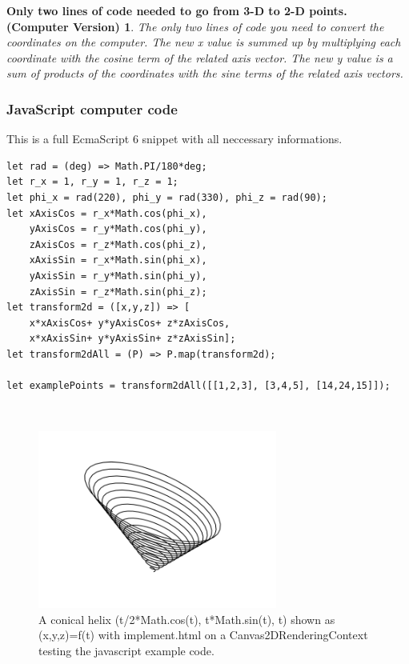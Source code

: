 \documentclass[a4paper]{article}
\begin{document}
\newtheorem{CodeTheorem}{Only two lines of code needed to go from 3-D to 2-D points. (Computer Version)}
\begin{CodeTheorem}
The only two lines of code you need to convert the coordinates on the computer. The new x value
is summed up by multiplying each coordinate with the cosine term of the related axis vector. The new y value
is a sum of products of the coordinates with the sine terms of the related axis vectors.
\end{CodeTheorem}

\subsubsection{JavaScript computer code}
\begin{example}
This is a full EcmaScript 6 snippet with all neccessary informations.\\
\begin{lstlisting}
let rad = (deg) => Math.PI/180*deg;
let r_x = 1, r_y = 1, r_z = 1; 
let phi_x = rad(220), phi_y = rad(330), phi_z = rad(90); 
let xAxisCos = r_x*Math.cos(phi_x), 
    yAxisCos = r_y*Math.cos(phi_y),
    zAxisCos = r_z*Math.cos(phi_z),
    xAxisSin = r_x*Math.sin(phi_x), 
    yAxisSin = r_y*Math.sin(phi_y),
    zAxisSin = r_z*Math.sin(phi_z);
let transform2d = ([x,y,z]) => [
    x*xAxisCos+ y*yAxisCos+ z*zAxisCos,
    x*xAxisSin+ y*yAxisSin+ z*zAxisSin];
let transform2dAll = (P) => P.map(transform2d);

let examplePoints = transform2dAll([[1,2,3], [3,4,5], [14,24,15]]);
\end{lstlisting}
\end{example}\\

\begin{figure}[ht]
\includegraphics[scale=0.5]{conicalhelix.png}
\caption{A conical helix (t/2*Math.cos(t), t*Math.sin(t), t) shown as (x,y,z)=f(t) with implement.html on a Canvas2DRenderingContext testing the javascript example code.}
\end{figure}
\end{document}

